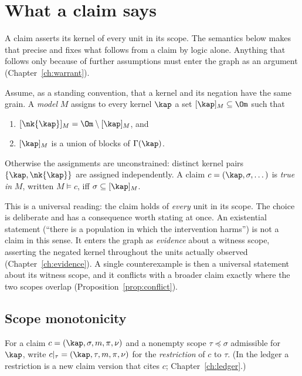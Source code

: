 \section{What a claim says}\label{sec:semantics}

A claim asserts its kernel of every unit in its scope. The semantics below makes that precise and fixes what follows from a claim by logic alone. Anything that follows only because of further assumptions must enter the graph as an argument (Chapter~\ref{ch:warrant}).

\begin{definition}\label{def:model}
Assume, as a standing convention, that a kernel and its negation have the same grain. A \emph{model} $M$ assigns to every kernel $\kap$ a set $[\kap]_M\subseteq\Om$ such that
\begin{enumerate}[label=(\roman*)]
\item $[\nk{\kap}]_M=\Om\setminus[\kap]_M$, and
\item $[\kap]_M$ is a union of blocks of $\Gamma(\kap)$.
\end{enumerate}
Otherwise the assignments are unconstrained: distinct kernel pairs $\{\kap,\nk{\kap}\}$ are assigned independently. A claim $c=(\kap,\sigma,\dots)$ is \emph{true in} $M$, written $M\models c$, iff $\sigma\subseteq[\kap]_M$.
\end{definition}

This is a universal reading: the claim holds of \emph{every} unit in its scope. The choice is deliberate and has a consequence worth stating at once. An existential statement (``there is a population in which the intervention harms'') is not a claim in this sense. It enters the graph as \emph{evidence} about a witness scope, asserting the negated kernel throughout the units actually observed (Chapter~\ref{ch:evidence}). A single counterexample is then a universal statement about its witness scope, and it conflicts with a broader claim exactly where the two scopes overlap (Proposition~\ref{prop:conflict}).

\subsection{Scope monotonicity}

For a claim $c=(\kap,\sigma,m,\pi,\nu)$ and a nonempty scope $\tau\preceq\sigma$ admissible for $\kap$, write $c|_\tau=(\kap,\tau,m,\pi,\nu)$ for the \emph{restriction} of $c$ to $\tau$. (In the ledger a restriction is a new claim version that cites $c$; Chapter~\ref{ch:ledger}.)

